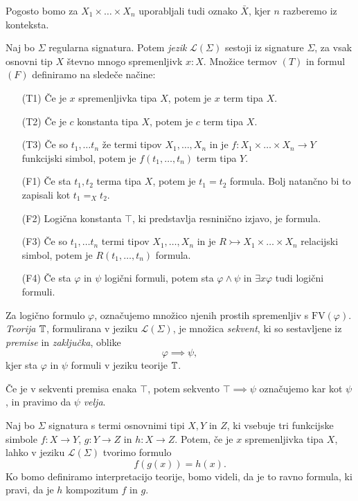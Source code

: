\documentclass[../kategoricna_logika.tex]{subfiles}
\begin{document}
Pogosto bomo za $X_1 \times \ldots \times X_n$ uporabljali tudi oznako
$\bar{X}$, kjer $n$ razberemo iz konteksta.
\begin{definicija}
  Naj bo $\Sigma$ regularna signatura.  Potem \emph{jezik}
  $\mathcal{L}(\Sigma)$ sestoji iz signature $\Sigma$, za vsak osnovni
  tip $X$ števno mnogo spremenljivk $x:X$.  Množice termov $(T)$
  in formul $(F)$ definiramo na sledeče načine:
  \begin{itemize}
  \item [(T1)] Če je $x$ spremenljivka tipa $X$, potem je $x$ term
    tipa $X$.
  \item [(T2)] Če je $c$ konstanta tipa $X$, potem je $c$ term tipa
    $X$.
  \item [(T3)] Če so $t_1, \ldots t_n$ že termi tipov
    $X_1, \ldots, X_n$ in je $f : X_1 \times \ldots \times X_n \to Y$
    funkcijski simbol, potem je $f(t_1, \ldots, t_n)$ term tipa $Y$.
  \item [(F1)] Če sta $t_1, t_2$ terma tipa $X$, potem je $t_1 = t_2$
    formula. Bolj natančno bi to zapisali kot $t_1 =_X t_2$.
  \item [(F2)] Logična konstanta $\top$, ki predstavlja resninično
    izjavo, je formula.
  \item [(F3)] Če so $t_1, \ldots t_n$ termi tipov $X_1, \ldots, X_n$
    in je $R \rightarrowtail X_1 \times \ldots \times X_n$ relacijski
    simbol, potem je $R(t_1, \ldots, t_n)$ formula.
  \item [(F4)] Če sta $\varphi$ in $\psi$ logični formuli, potem sta
    $\varphi \wedge \psi$ in $\exists x \varphi$ tudi logični formuli.
  \end{itemize}
  Za logično formulo $\varphi$, označujemo množico njenih prostih
  spremenljiv s $\mathrm{FV}(\varphi)$.  \emph{Teorija} $\mathbb{T}$,
  formulirana v jeziku $\mathcal{L}(\Sigma)$, je množica
  \emph{sekvent}, ki so sestavljene iz \emph{premise} in
  \emph{zaključka}, oblike
  $$\varphi \implies \psi,$$
  kjer sta $\varphi$ in $\psi$ formuli v jeziku teorije $\mathbb{T}$.
\end{definicija}
Če je v sekventi premisa enaka $\top$, potem sekvento $\top \implies \psi$
označujemo kar kot $\psi$, in pravimo da $\psi$ \emph{velja}.
\begin{primer}\label{primer:kompozitum}
  Naj bo $\Sigma$ signatura s termi osnovnimi tipi $X,Y$ in $Z$, ki vsebuje
  tri funkcijske simbole $f: X \to Y$, $g : Y \to Z$ in $h : X \to Z$.
  Potem, če je $x$ spremenljivka tipa $X$, lahko v jeziku
  $\mathcal{L}(\Sigma)$ tvorimo formulo
  $$f(g(x)) = h(x).$$
  Ko bomo definiramo interpretacijo teorije, bomo videli, da je to ravno
  formula, ki pravi, da je $h$ kompozitum $f$ in $g$.
\end{primer}
\end{document}
